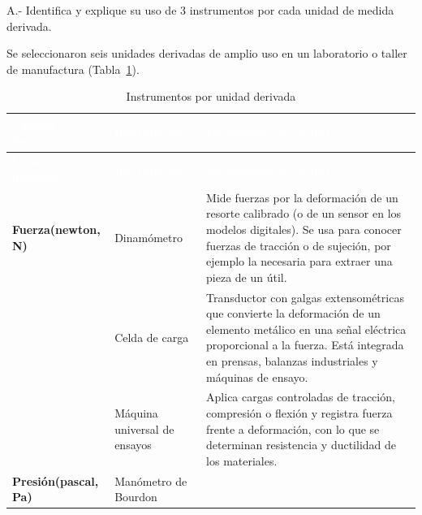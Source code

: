 \documentclass[12pt,a4paper]{article}
\newcommand{\encab}[1]{\textcolor{white}{\sffamily\bfseries #1}}
\begin{document}
\begin{enunciado}
	A.- Identifica y explique su uso de 3 instrumentos por cada unidad de medida
	derivada.
\end{enunciado}

Se seleccionaron seis unidades derivadas de amplio uso en un laboratorio o
taller de manufactura (Tabla~\ref{tab:cuestionarioA}).

	{\small
		\setlength{\tabcolsep}{5pt}
		\begin{longtable}{>{\raggedright\arraybackslash\bfseries}p{2.45cm}
				>{\raggedright\arraybackslash}p{3.3cm}
				>{\raggedright\arraybackslash}p{8.4cm}}
			\caption{Instrumentos por unidad derivada}\label{tab:cuestionarioA}
			\\
			\rowcolor{darkblue}\encab{Unidad derivada}       & \encab{Instrumento}
			                                                 & \encab{Explicación de
				                                                   su uso}
			\\
			\endfirsthead
			\rowcolor{darkblue}\encab{Unidad derivada}       & \encab{Instrumento}
			                                                 &
			\encab{Explicación de su uso}
			\\
			\endhead
			\rowcolor{lightblue}
			Fuerza\newline(newton, N)                        & Dinamómetro
			                                                 & Mide fuerzas por la
			deformación de un resorte calibrado (o de un sensor en los
			modelos digitales). Se usa para conocer fuerzas de tracción o de sujeción,
			por
			ejemplo la necesaria para extraer una pieza de un útil.
			\\
			\rowcolor{lightblue}
			                                                 & Celda de carga
			                                                 & Transductor con galgas
			extensométricas que convierte la deformación de un
			elemento metálico en una señal eléctrica proporcional a la fuerza. Está
			integrada en prensas, balanzas industriales y máquinas de ensayo.
			\\
			\rowcolor{lightblue}
			                                                 & Máquina universal de
			ensayos                                          & Aplica cargas
			controladas de tracción, compresión o flexión y registra fuerza frente a
			deformación, con lo que se determinan resistencia y ductilidad de los
			materiales.
			\\
			Presión\newline(pascal, Pa)                      & Manómetro de Bourdon

\end{longtable}}
\end{document}
